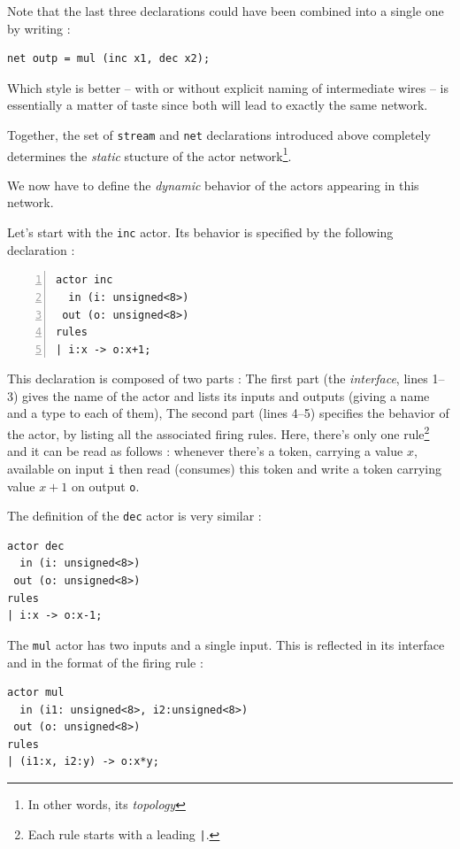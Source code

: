 \medskip
Note that the last three declarations could have been combined into a single one by writing :

\begin{lstlisting}[style=CaphStyle]
net outp = mul (inc x1, dec x2);
\end{lstlisting}

Which style is better -- with or without explicit naming of intermediate wires -- is essentially a
matter of taste since both will lead to exactly the same network. 

\medskip Together, the set of \texttt{stream} and \texttt{net} declarations introduced above
completely determines the \emph{static} stucture of the actor network\footnote{In other words, its
  \emph{topology}}.

\medskip
We now have to define the \emph{dynamic} behavior of the actors appearing in this network.

Let's start with the \texttt{inc} actor. Its behavior is specified by the following declaration :

\begin{lstlisting}[style=CaphStyle,numbers=left,numberstyle=\tiny]
actor inc
  in (i: unsigned<8>)
 out (o: unsigned<8>)
rules
| i:x -> o:x+1;
\end{lstlisting}

This declaration is composed of two parts : The first part (the \emph{interface}, lines 1--3) gives
the name of the actor and lists its inputs and outputs (giving a name and a type to each of them),
The second part (lines 4--5) specifies the behavior of the actor, by listing all the associated
firing rules. Here, there's only one rule\footnote{Each rule starts with a leading \texttt{|}.} and
it can be read as follows : whenever there's a token, carrying a value $x$, available on input
\texttt{i} then read (consumes) this token and write a token carrying value $x+1$ on output
\texttt{o}.

\medskip 
The definition of the \texttt{dec} actor is very similar : 

\begin{lstlisting}[style=CaphStyle]
actor dec
  in (i: unsigned<8>)
 out (o: unsigned<8>)
rules
| i:x -> o:x-1;
\end{lstlisting}

\medskip
The \texttt{mul} actor has two inputs and a single input. This is reflected in its interface and in
the format of the firing rule :

\begin{lstlisting}[style=CaphStyle]
actor mul
  in (i1: unsigned<8>, i2:unsigned<8>)
 out (o: unsigned<8>)
rules
| (i1:x, i2:y) -> o:x*y;
\end{lstlisting}

